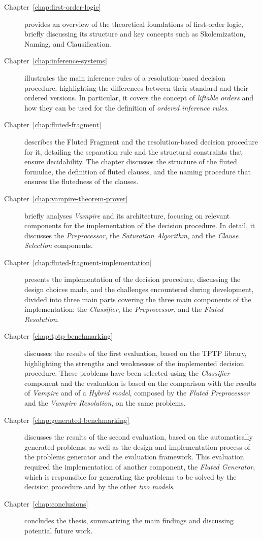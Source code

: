 \begin{description}
    \item[Chapter~\ref{chap:first-order-logic}] provides an overview of the theoretical foundations of first-order logic, briefly discussing its structure and key concepts such as Skolemization, Naming, and Clausification.
    \item[Chapter~\ref{chap:inference-systems}] illustrates the main inference rules of a resolution-based decision procedure, highlighting the differences between their standard and their ordered versions. In particular, it covers the concept of \emph{liftable orders} and how they can be used for the definition of \emph{ordered inference rules}.
    \item[Chapter~\ref{chap:fluted-fragment}] describes the Fluted Fragment and the resolution-based decision procedure for it, detailing the separation rule and the structural constraints that ensure decidability. The chapter discusses the structure of the fluted formulae, the definition of fluted clauses, and the naming procedure that ensures the flutedness of the clauses.
    \item[Chapter~\ref{chap:vampire-theorem-prover}] briefly analyses \emph{Vampire} and its architecture, focusing on relevant components for the implementation of the decision procedure. In detail, it discusses the \emph{Preprocessor}, the \emph{Saturation Algorithm}, and the \emph{Clause Selection} components.
    \item[Chapter~\ref{chap:fluted-fragment-implementation}] presents the implementation of the decision procedure, discussing the design choices made, and the challenges encountered during development, divided into three main parts covering the three main components of the implementation: the \emph{Classifier}, the \emph{Preprocessor}, and the \emph{Fluted Resolution}.
    \item[Chapter~\ref{chap:tptp-benchmarking}] discusses the results of the first evaluation, based on the TPTP library, highlighting the strengths and weaknesses of the implemented decision procedure. These problems have been selected using the \emph{Classifier} component and the evaluation is based on the comparison with the results of \emph{Vampire} and of a \emph{Hybrid model}, composed by the \emph{Fluted Preprocessor} and the \emph{Vampire Resolution}, on the same problems.
    \item[Chapter~\ref{chap:generated-benchmarking}] discusses the results of the second evaluation, based on the automatically generated problems, as well as the design and implementation process of the problems generator and the evaluation framework. This evaluation required the implementation of another component, the \emph{Fluted Generator}, which is responsible for generating the problems to be solved by the decision procedure and by the other \emph{two models}.
    \item[Chapter~\ref{chap:conclusions}] concludes the thesis, summarizing the main findings and discussing potential future work.
\end{description}



